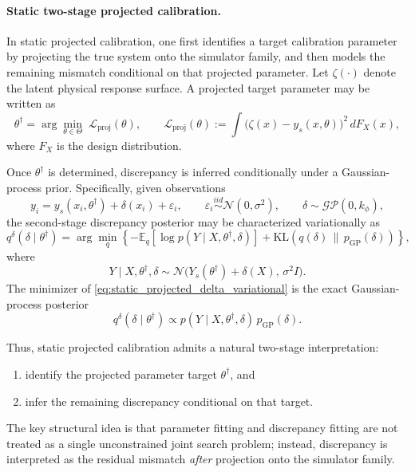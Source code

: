 \documentclass{article}
\begin{document}
\paragraph{Static two-stage projected calibration.}
In static projected calibration, one first identifies a target calibration parameter by projecting the true system onto the simulator family, and then models the remaining mismatch conditional on that projected parameter. Let $\zeta(\cdot)$ denote the latent physical response surface. A projected target parameter may be written as
\begin{equation}
\theta^\dagger
=
\arg\min_{\theta \in \Theta}
\;
\mathcal L_{\mathrm{proj}}(\theta),
\qquad
\mathcal L_{\mathrm{proj}}(\theta)
:=
\int
\big(
\zeta(x)-y_s(x,\theta)
\big)^2
\,dF_X(x),
\label{eq:static_projected_target}
\end{equation}
where $F_X$ is the design distribution.

Once $\theta^\dagger$ is determined, discrepancy is inferred conditionally under a Gaussian-process prior. Specifically, given observations
\begin{equation}
y_i = y_s(x_i,\theta^\dagger) + \delta(x_i) + \varepsilon_i,
\qquad
\varepsilon_i \stackrel{iid}{\sim} \mathcal N(0,\sigma^2),
\qquad
\delta \sim \mathcal{GP}(0,k_\phi),
\label{eq:static_projected_gp_model}
\end{equation}
the second-stage discrepancy posterior may be characterized variationally as
\begin{equation}
q^\delta(\delta \mid \theta^\dagger)
=
\arg\min_q
\left\{
-
\mathbb E_q\!\left[
\log p(Y \mid X,\theta^\dagger,\delta)
\right]
+
\mathrm{KL}\!\left(
q(\delta)\,\|\,p_{\mathrm{GP}}(\delta)
\right)
\right\},
\label{eq:static_projected_delta_variational}
\end{equation}
where
\begin{equation}
Y \mid X,\theta^\dagger,\delta
\sim
\mathcal N\!\big(
Y_s(\theta^\dagger)+\delta(X),\,
\sigma^2 I
\big).
\label{eq:static_projected_delta_likelihood}
\end{equation}
The minimizer of \eqref{eq:static_projected_delta_variational} is the exact Gaussian-process posterior
\begin{equation}
q^\delta(\delta \mid \theta^\dagger)
\propto
p(Y \mid X,\theta^\dagger,\delta)\,p_{\mathrm{GP}}(\delta).
\label{eq:static_projected_delta_posterior}
\end{equation}

Thus, static projected calibration admits a natural two-stage interpretation:
\begin{enumerate}[leftmargin=1.5em]
    \item identify the projected parameter target $\theta^\dagger$, and
    \item infer the remaining discrepancy conditional on that target.
\end{enumerate}
The key structural idea is that parameter fitting and discrepancy fitting are not treated as a single unconstrained joint search problem; instead, discrepancy is interpreted as the residual mismatch \emph{after} projection onto the simulator family.
\end{document}
